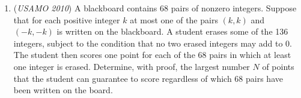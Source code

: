 \begin{enumerate}
 Prove that if $\dfrac{1}{p}-2S_q = \dfrac{m}{n}$ for relatively prime integers
$m$ and $n$, then $m-n$ is divisible by $p$.


 

	\item (\textit{USAMO 2010}) A blackboard contains 68 pairs of nonzero integers.  Suppose that for each positive integer $k$ at most one of the pairs $(k, k)$ and $(-k, -k)$ is written on the blackboard.  A student erases some of the 136 integers, subject to the condition that no two erased integers may add to 0.  The student then scores one point for each of the 68 pairs in which at least one integer is erased.  Determine, with proof, the largest number $N$ of points that the student can guarantee to score regardless of which 68 pairs have been written on the board.


 

\end{enumerate}